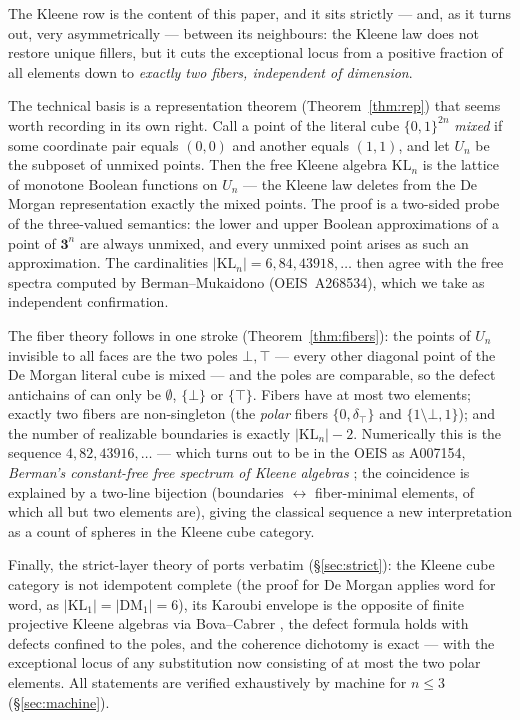 \documentclass[11pt]{amsart}
\theoremstyle{definition}
\newcommand{\DM}{\mathrm{DM}}
\newcommand{\KL}{\mathrm{KL}}
\newcommand{\uc}{U}
\newcommand{\Kthree}{\mathbf{3}}
\begin{document}
\noindent The Kleene row is the content of this paper, and it sits
strictly --- and, as it turns out, very asymmetrically --- between
its neighbours: the Kleene law does not restore unique fillers, but
it cuts the exceptional locus from a positive fraction of all
elements down to \emph{exactly two fibers, independent of
dimension}.

The technical basis is a representation theorem
(Theorem~\ref{thm:rep}) that seems worth recording in its own
right.  Call a point of the literal cube $\{0,1\}^{2n}$
\emph{mixed} if some coordinate pair equals $(0,0)$ and another
equals $(1,1)$, and let $\uc_n$ be the subposet of unmixed points.
Then the free Kleene algebra $\KL_n$ is the lattice of monotone
Boolean functions on $\uc_n$ --- the Kleene law deletes from the De
Morgan representation \cite{DMFibers} exactly the mixed points.
The proof is a two-sided probe of the three-valued semantics: the
lower and upper Boolean approximations of a point of $\Kthree^n$
are always unmixed, and every unmixed point arises as such an
approximation.  The cardinalities
$|\KL_n| = 6, 84, 43918, \dots$ then agree with the free spectra
computed by Berman--Mukaidono \cite{BermanMukaidono}
(OEIS~A268534), which we take as independent confirmation.

The fiber theory follows in one stroke
(Theorem~\ref{thm:fibers}): the points of $\uc_n$ invisible to all
faces are the two poles $\bot, \top$ --- every other diagonal point
of the De Morgan literal cube is mixed --- and the poles are
comparable, so the defect antichains of \cite{DMFibers,StrictDM}
can only be $\emptyset$, $\{\bot\}$ or $\{\top\}$.  Fibers have at
most two elements; exactly two fibers are non-singleton (the
\emph{polar} fibers $\{0, \delta_{\top}\}$ and
$\{1 \setminus \bot, 1\}$); and the number of realizable boundaries
is exactly $|\KL_n| - 2$.  Numerically this is the sequence
$4, 82, 43916, \dots$ --- which turns out to be in the OEIS as
A007154, \emph{Berman's constant-free free spectrum of Kleene
algebras} \cite{Berman}; the coincidence is explained by a
two-line bijection (boundaries $\leftrightarrow$ fiber-minimal
elements, of which all but two elements are), giving the classical
sequence a new interpretation as a count of spheres in the Kleene
cube category.

Finally, the strict-layer theory of \cite{StrictDM} ports verbatim
(\S\ref{sec:strict}): the Kleene cube category is not idempotent
complete (the proof for De Morgan applies word for word, as
$|\KL_1| = |\DM_1| = 6$), its Karoubi envelope is the opposite of
finite projective Kleene algebras via Bova--Cabrer
\cite[Thm.~12]{BovaCabrer}, the defect formula holds with defects
confined to the poles, and the coherence dichotomy is exact --- with
the exceptional locus of any substitution now consisting of at most
the two polar elements.  All statements are verified exhaustively
by machine for $n \leq 3$ (\S\ref{sec:machine}).
\end{document}
